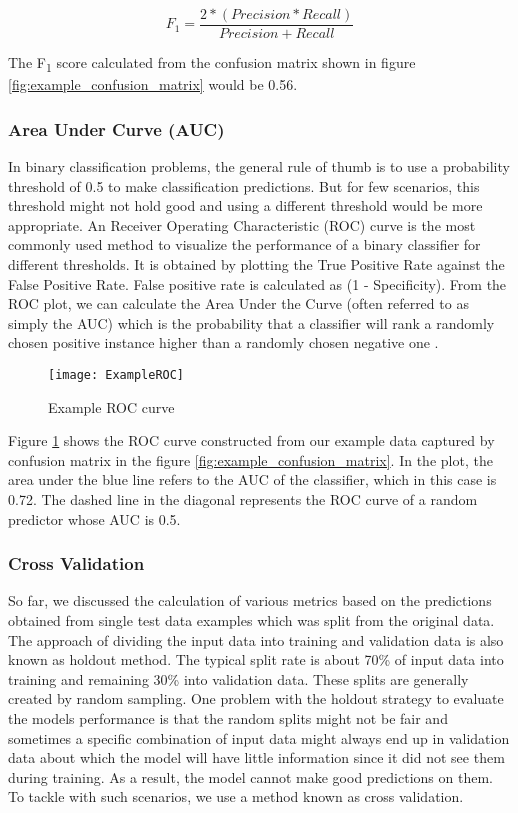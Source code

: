 \documentclass[11pt,openright]{report}
\begin{document}
\begin{equation}
F_{1} = \dfrac{2*(Precision * Recall) }{Precision + Recall} \label{eq:Precision} 
 \end{equation}

The F\textsubscript{1} score calculated from the confusion matrix shown in figure \ref{fig:example_confusion_matrix} would be 0.56.


\subsubsection{Area Under Curve (AUC)}

In binary classification problems, the general rule of thumb is to use a probability threshold of 0.5 to make classification predictions. But for few scenarios, this threshold might not hold good and using a different threshold would be more appropriate. An Receiver Operating Characteristic (ROC) curve is the most commonly used method to visualize the performance of a binary classifier for different thresholds. It is obtained by plotting the True Positive Rate against the False Positive Rate. False positive rate is calculated as (1 - Specificity). From the ROC plot, we can calculate the Area Under the Curve (often referred to as simply the AUC) which is the probability that a classifier will rank a randomly chosen positive instance higher than a randomly chosen negative one \cite{fawcett2006introduction}.


  \begin{figure}[!htbp]
	\centering
	\texttt{[image: ExampleROC]}
	\caption{Example ROC curve}
	\label{fig:example_roc}
\end{figure} 

Figure \ref{fig:example_roc} shows the ROC curve constructed from our example data captured by confusion matrix in the figure \ref{fig:example_confusion_matrix}. In the plot, the area under the blue line refers to the AUC of the classifier, which in this case is 0.72. The dashed line in the diagonal represents the ROC curve of a random predictor whose AUC is 0.5.

\subsubsection{Cross Validation}
So far, we discussed the calculation of various metrics based on the predictions obtained from single test data examples which was split from the original data. The approach of dividing the input data into training and validation data is also known as holdout method. The typical split rate is about 70\% of input data into training and remaining 30\% into validation data. These splits are generally created by random sampling. One problem with the holdout strategy to evaluate the models performance is that the random splits might not be fair and sometimes a specific combination of input data might always end up in validation data about which the model will have little information since it did not see them during training. As a result, the model cannot make good predictions on them. To tackle with such scenarios, we use a method known as cross validation. 
\end{document}
